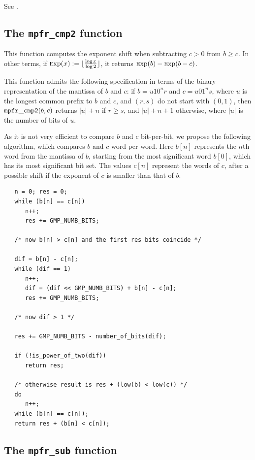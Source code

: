 \documentclass[12pt]{amsart}
\def\Exp{{\rm \textsc exp}}
\begin{document}
See \cite{lefevre:inria-00000026}.

\subsection{The {\tt mpfr\_cmp2} function}

This function computes the exponent shift when subtracting $c > 0$ from
$b \ge c$. In other terms, if $\Exp(x) :=
\lfloor \frac{\log x}{\log 2} \rfloor$,
it returns $\Exp(b) - \Exp(b-c)$.

This function admits the following specification in terms of the binary
representation of the mantissa of $b$ and $c$: if $b = u 1 0^n r$ and
$c = u 0 1^n s$, where $u$ is the longest common prefix to $b$ and $c$,
and $(r,s)$ do not start with $(0, 1)$, then ${\tt mpfr\_cmp2}(b,c)$ returns
$|u| + n$ if $r \ge s$, and $|u| + n + 1$ otherwise, where $|u|$ is the number
of bits of $u$.

As it is not very efficient to compare $b$ and $c$ bit-per-bit, we propose
the following algorithm, which compares $b$ and $c$ word-per-word.
Here $b[n]$ represents the $n$th word from the mantissa of $b$, starting from
the most significant word $b[0]$, which has its most significant bit set.
The values $c[n]$ represent the words of $c$, after a possible shift if the
exponent of $c$ is smaller than that of $b$.
\begin{verbatim}
   n = 0; res = 0;
   while (b[n] == c[n])
      n++;
      res += GMP_NUMB_BITS;

   /* now b[n] > c[n] and the first res bits coincide */

   dif = b[n] - c[n];
   while (dif == 1)
      n++;
      dif = (dif << GMP_NUMB_BITS) + b[n] - c[n];
      res += GMP_NUMB_BITS;

   /* now dif > 1 */

   res += GMP_NUMB_BITS - number_of_bits(dif);

   if (!is_power_of_two(dif))
      return res;

   /* otherwise result is res + (low(b) < low(c)) */
   do
      n++;
   while (b[n] == c[n]);
   return res + (b[n] < c[n]);
\end{verbatim}

\subsection{The {\tt mpfr\_sub} function}
\end{document}
